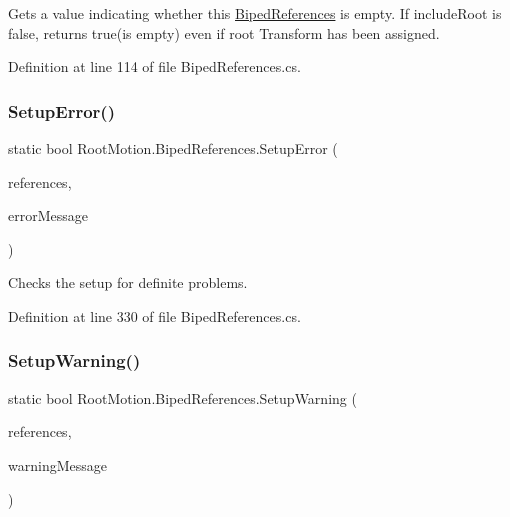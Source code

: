 Gets a value indicating whether this \mbox{\hyperlink{class_root_motion_1_1_biped_references}{Biped\+References}} is empty. If include\+Root is false, returns true(is empty) even if root Transform has been assigned. 



Definition at line 114 of file Biped\+References.\+cs.

\mbox{\label{class_root_motion_1_1_biped_references_aa51cbda78013925d19b3eb540492f96b}} 
\subsubsection{\texorpdfstring{Setup\+Error()}{SetupError()}}
{\footnotesize\ttfamily static bool Root\+Motion.\+Biped\+References.\+Setup\+Error (\begin{DoxyParamCaption}\item[{\mbox{\hyperlink{class_root_motion_1_1_biped_references}{Biped\+References}}}]{references,  }\item[{ref string}]{error\+Message }\end{DoxyParamCaption})\hspace{0.3cm}{\ttfamily [static]}}



Checks the setup for definite problems. 



Definition at line 330 of file Biped\+References.\+cs.

\mbox{\label{class_root_motion_1_1_biped_references_a43eed3ca43bc5b7b4aff4631ddcbd650}} 
\subsubsection{\texorpdfstring{Setup\+Warning()}{SetupWarning()}}
{\footnotesize\ttfamily static bool Root\+Motion.\+Biped\+References.\+Setup\+Warning (\begin{DoxyParamCaption}\item[{\mbox{\hyperlink{class_root_motion_1_1_biped_references}{Biped\+References}}}]{references,  }\item[{ref string}]{warning\+Message }\end{DoxyParamCaption})\hspace{0.3cm}{\ttfamily [static]}}




